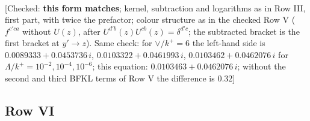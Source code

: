 \documentclass[9pt]{article}
\numberwithin{equation}{section}
\begin{document}
\begin{align}
\end{align} {\color{red}[Checked: \textbf{this form matches}; kernel, subtraction and logarithms as in Row III, first part, with twice the prefactor; colour structure as in the checked Row V ($f^{c'ca}$ without $U(z)$, after $U^{d'b}(z)U^{cb}(z)=\delta^{d'c}$; the subtracted bracket is the first bracket at $y'\to z$). Same check: for $\vee/k^{+}=6$ the left-hand side is $0.0089333+0.0453736\,i$, $0.0103322+0.0461993\,i$, $0.0103462+0.0462076\,i$ for $\Lambda/k^{+}=10^{-2},10^{-4},10^{-6}$; this equation: $0.0103463+0.0462076\,i$; without the second and third BFKL terms of Row V the difference is $0.32$]}\par\noindent
\subsection{Row VI}
\end{document}
